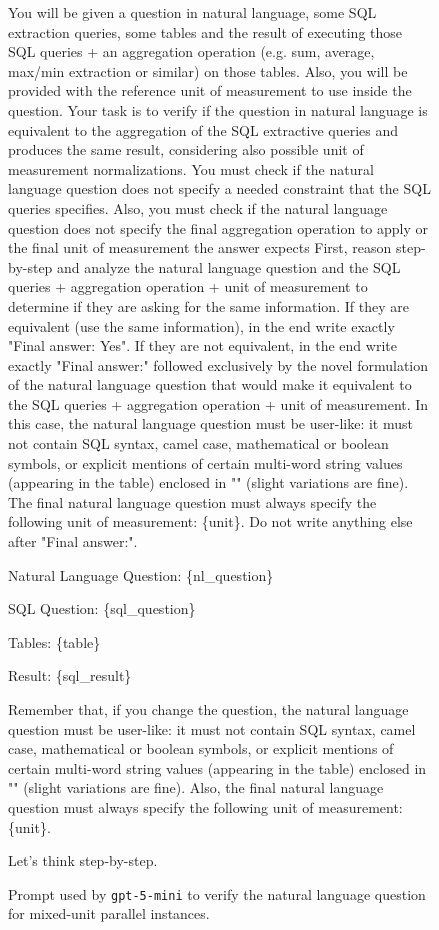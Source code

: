 \begin{figure}[t!]\small
\centering
\begin{tcolorbox}[
  title=Parallel mixed unit question verification prompt,
  fonttitle=\bfseries,
  sharp corners=all,
]

You will be given a question in natural language, some SQL extraction queries, some tables and the result of executing those SQL queries + an aggregation operation (e.g. sum, average, max/min extraction or similar) on those tables. Also, you will be provided with the reference unit of measurement to use inside the question.
Your task is to verify if the question in natural language is equivalent to the aggregation of the SQL extractive queries and produces the same result, considering also possible unit of measurement normalizations.
You must check if the natural language question does not specify a needed constraint that the SQL queries specifies.
Also, you must check if the natural language question does not specify the final aggregation operation to apply or the final unit of measurement the answer expects
First, reason step-by-step and analyze the natural language question and the SQL queries + aggregation operation + unit of measurement to determine if they are asking for the same information.
If they are equivalent (use the same information), in the end write exactly "Final answer: Yes".
If they are not equivalent, in the end write exactly "Final answer:" followed exclusively by the novel formulation of the natural language question that would make it equivalent to the SQL queries + aggregation operation + unit of measurement.
In this case, the natural language question must be user-like: it must not contain SQL syntax, camel case, mathematical or boolean symbols, or explicit mentions of certain multi-word string values (appearing in the table) enclosed in "" (slight variations are fine).
The final natural language question must always specify the following unit of measurement: \{unit\}.
Do not write anything else after "Final answer:".

\vspace{\baselineskip}
Natural Language Question: \{nl\_question\}

SQL Question: \{sql\_question\}

Tables: \{table\}

Result: \{sql\_result\}
\vspace{\baselineskip}

Remember that, if you change the question, the natural language question must be user-like: it must not contain SQL syntax, camel case, mathematical or boolean symbols, or explicit mentions of certain multi-word string values (appearing in the table) enclosed in "" (slight variations are fine).
Also, the final natural language question must always specify the following unit of measurement: \{unit\}.

Let's think step-by-step.

\end{tcolorbox}
\caption{Prompt used by \texttt{gpt-5-mini} to verify the natural language question for mixed-unit parallel instances.}
\label{fig:par_ver_prompt}
\end{figure}

